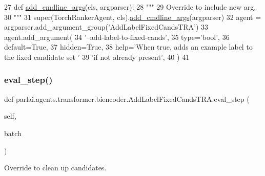 \begin{DoxyCode}
27     \textcolor{keyword}{def }\hyperlink{namespaceparlai_1_1agents_1_1drqa_1_1config_a62fdd5554f1da6be0cba185271058320}{add\_cmdline\_args}(cls, argparser):
28         \textcolor{stringliteral}{"""}
29 \textcolor{stringliteral}{        Override to include new arg.}
30 \textcolor{stringliteral}{        """}
31         super(TorchRankerAgent, cls).\hyperlink{namespaceparlai_1_1agents_1_1drqa_1_1config_a62fdd5554f1da6be0cba185271058320}{add\_cmdline\_args}(argparser)
32         agent = argparser.add\_argument\_group(\textcolor{stringliteral}{'AddLabelFixedCandsTRA'})
33         agent.add\_argument(
34             \textcolor{stringliteral}{'--add-label-to-fixed-cands'},
35             type=\textcolor{stringliteral}{'bool'},
36             default=\textcolor{keyword}{True},
37             hidden=\textcolor{keyword}{True},
38             help=\textcolor{stringliteral}{'When true, adds an example label to the fixed candidate set '}
39             \textcolor{stringliteral}{'if not already present'},
40         )
41 
\end{DoxyCode}
\mbox{\label{classparlai_1_1agents_1_1transformer_1_1biencoder_1_1AddLabelFixedCandsTRA_ae05059428f346f00e73289120ffb6c1e}} 
\subsubsection{\texorpdfstring{eval\+\_\+step()}{eval\_step()}}
{\footnotesize\ttfamily def parlai.\+agents.\+transformer.\+biencoder.\+Add\+Label\+Fixed\+Cands\+T\+R\+A.\+eval\+\_\+step (\begin{DoxyParamCaption}\item[{}]{self,  }\item[{}]{batch }\end{DoxyParamCaption})}

\begin{DoxyVerb}Override to clean up candidates.
\end{DoxyVerb}
 

